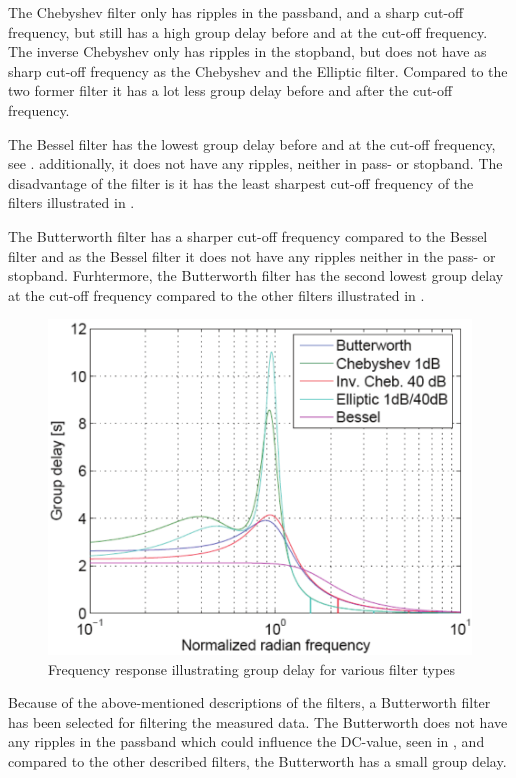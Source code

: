 The Chebyshev filter only has ripples in the passband, and a sharp cut-off frequency, but still has a high group delay before and at the cut-off frequency. The inverse Chebyshev only has ripples in the stopband, but does not have as sharp cut-off frequency as the Chebyshev and the Elliptic filter. Compared to the two former filter it has a lot less group delay before and after the cut-off frequency.

The Bessel filter has the lowest group delay before and at the cut-off frequency, see . additionally, it does not have any ripples, neither in pass- or stopband. The disadvantage of the filter is it has the least sharpest cut-off frequency of the filters illustrated in .

The Butterworth filter has a sharper cut-off frequency compared to the Bessel filter and as the Bessel filter it does not have any ripples neither in the pass- or stopband. Furhtermore, the Butterworth filter has the second lowest group delay at the cut-off frequency compared to the other filters illustrated in . 

\begin{figure}[H]
	\centering
	\includegraphics[scale=0.7]{figures/Filtertypes2.pdf}
	\caption{Frequency response illustrating group delay for various filter types}
	\label{fig:groupdelay}
\end{figure}

Because of the above-mentioned descriptions of the filters, a Butterworth filter has been selected for filtering the measured data. The Butterworth does not have any ripples in the passband which could influence the DC-value, seen in , and compared to the other described filters, the Butterworth has a small group delay.

